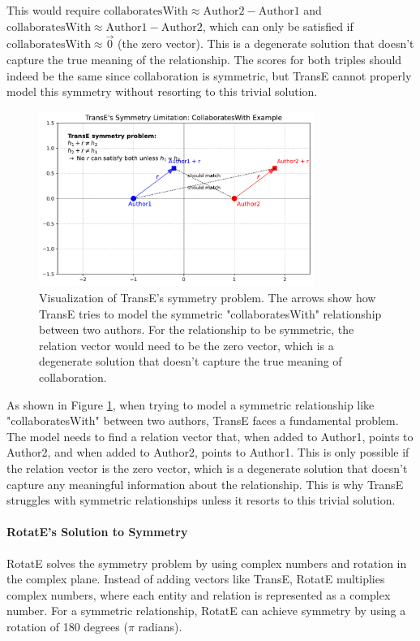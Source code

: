 \documentclass[10pt,a4paper]{article}
\begin{document}
This would require $\text{collaboratesWith} \approx \text{Author2} - \text{Author1}$ and $\text{collaboratesWith} \approx \text{Author1} - \text{Author2}$, which can only be satisfied if $\text{collaboratesWith} \approx \vec{0}$ (the zero vector). This is a degenerate solution that doesn't capture the true meaning of the relationship. The scores for both triples should indeed be the same since collaboration is symmetric, but TransE cannot properly model this symmetry without resorting to this trivial solution.

\begin{figure}[H]
    \centering
    \includegraphics[width=0.8\textwidth]{img/transe_symmetry.pdf}
    \caption{Visualization of TransE's symmetry problem. The arrows show how TransE tries to model the symmetric "collaboratesWith" relationship between two authors. For the relationship to be symmetric, the relation vector would need to be the zero vector, which is a degenerate solution that doesn't capture the true meaning of collaboration.}
    \label{fig:transe_symmetry}
\end{figure}

As shown in Figure \ref{fig:transe_symmetry}, when trying to model a symmetric relationship like "collaboratesWith" between two authors, TransE faces a fundamental problem. The model needs to find a relation vector that, when added to Author1, points to Author2, and when added to Author2, points to Author1. This is only possible if the relation vector is the zero vector, which is a degenerate solution that doesn't capture any meaningful information about the relationship. This is why TransE struggles with symmetric relationships unless it resorts to this trivial solution.

\paragraph{RotatE's Solution to Symmetry}
RotatE solves the symmetry problem by using complex numbers and rotation in the complex plane. Instead of adding vectors like TransE, RotatE multiplies complex numbers, where each entity and relation is represented as a complex number. For a symmetric relationship, RotatE can achieve symmetry by using a rotation of 180 degrees ($\pi$ radians).
\end{document}
